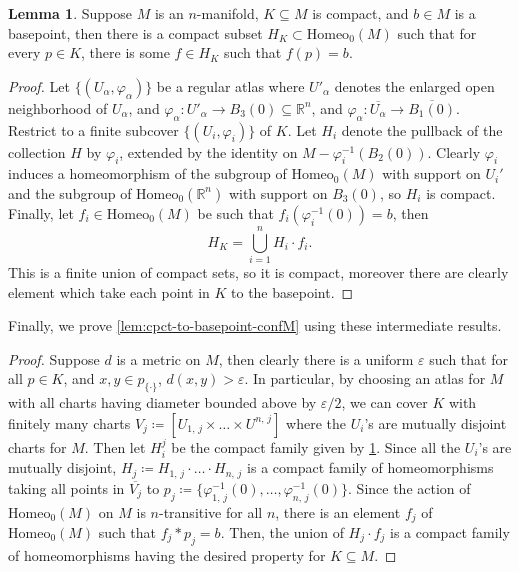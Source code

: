\documentclass[10pt, oneside]{article}
\newcommand{\R}{\mathbb{R}}
\newcommand{\homeo}[1][S^1]{\text{Homeo}_0(#1)}
\newcommand{\cl}[1]{\overline{#1}}
\newcommand{\set}{{\{\cdot\}}}
\theoremstyle{definition}
\newtheorem{lem}{Lemma}[section]
\theoremstyle{definition}
\begin{document}
\begin{lem}\label{lem:cpct-to-basepoint-M}
    Suppose $M$ is an $n$-manifold, $K\subseteq M$ is compact, and $b\in M$ is a basepoint, then there is a compact subset $H_K\subset\homeo[M]$ such that for every $p\in K$, there is some $f\in H_K$ such that $f(p)=b$.
\end{lem}
\begin{proof}
    Let $\{(U_\alpha, \varphi_\alpha)\}$ be a regular atlas where $U'_\alpha$ denotes the enlarged open neighborhood of $U_\alpha$, and $\varphi_\alpha:U'_\alpha \to B_3(0)\subseteq \R^n$, and $\varphi_\alpha:\cl{U_\alpha} \to \cl{B_1(0)}$. Restrict to a finite subcover $\{(U_i, \varphi_i)\}$ of $K$. Let $H_i$ denote the pullback of the collection $H$ by $\varphi_i$, extended by the identity on $M-\varphi_i^{-1}(B_2(0))$. Clearly $\varphi_i$ induces a homeomorphism of the subgroup of $\homeo[M]$ with support on $U_i'$ and the subgroup of $\homeo[\R^n]$ with support on $B_3(0)$, so $H_i$ is compact. Finally, let $f_i\in\homeo[M]$ be such that $f_i(\varphi_i^{-1}(0)) = b$, then $$H_K = \bigcup_{i=1}^n H_i\cdot f_i.$$
    This is a finite union of compact sets, so it is compact, moreover there are clearly element which take each point in $K$ to the basepoint.
\end{proof}

Finally, we prove \cref{lem:cpct-to-basepoint-confM} using these intermediate results.

\begin{proof}
    Suppose $d$ is a metric on $M$, then clearly there is a uniform $\varepsilon$ such that for all $p\in K$, and $x, y\in p_\set$, $d(x,y)>\varepsilon$. In particular, by choosing an atlas for $M$ with all charts having diameter bounded above by $\varepsilon/2$, we can cover $K$ with finitely many charts $V_j \coloneqq [U_{1,\,j}\times\dots\times U^{n,\, j}]$ where the $U_i$'s are mutually disjoint charts for $M$. Then let $H^j_i$ be the compact family given by \cref{lem:cpct-to-basepoint-M}. Since all the $U_i$'s are mutually disjoint, $H_j\coloneqq H_{1,\,j}\cdot\dots\cdot H_{n,\, j}$ is a compact family of homeomorphisms taking all points in $\cl{V_j}$ to $p_j\coloneqq\{\varphi_{1,\, j}^{-1}(0),\dots, \varphi_{n,\, j}^{-1}(0)\}$. Since the action of $\homeo[M]$ on $M$ is $n$-transitive for all $n$, there is an element $f_j$ of $\homeo[M]$ such that $f_j*p_j = b$. Then, the union of $H_j\cdot f_j$ is a compact family of homeomorphisms having the desired property for $K\subseteq M$.
\end{proof}
\end{document}
